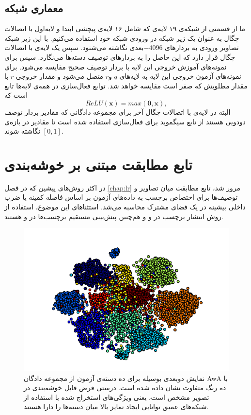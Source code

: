 \subsection{معماری شبکه}\label{net_architechture}
ما از قسمتی از شبکه‌ی ۱۹ لایه‌ی  \cite{vgg} که شامل ۱۶ لایه‌ی پیچشی ابتدا و لایه‌‌‌اول با اتصالات چگال به عنوان یک زیر شبکه در ورودی شبکه خود استفاده می‌کنیم. با این زیر شبکه تصاویر ورودی به بردارهای $-4096$بعدی نگاشته می‌شنود. سپس یک لایه‌ی با اتصالات چگال قرار دارد که این حاصل را به بردارهای توصیف دسته‌ها می‌نگارد. سپس برای نمونه‌های آموزش خروجی این لایه با بردار توصیف صحیح مقایسه می‌شود. برای نمونه‌های آزمون خروجی این لایه به  لایه‌های  $q$ و$r$ متصل می‌شود و مقدار خروجی $r$ با مقدار مطلوبش که صفر است مقایسه خواهد شد.
توابع فعال‌سازی در همه‌ی لایه‌ها تابع  است که
\begin{equation}
ReLU(\mathbf{x}) = max(\mathbf{0,x}),
\end{equation}
البته در لایه‌ی با اتصالات چگال آخر برای مجموعه‌ دادگانی که مقادیر بردار توصف دودویی هستند از تابع سیگموید برای فعال‌سازی استفاده شده است تا مقادیر در بازه‌ی $[0,1]$ نگاشته شوند.
\section{ تابع مطابقت مبتنی بر خوشه‌بندی }\label{compatibility_funcion}
در اکثر روش‌های پیشین که در فصل \ref{chap:lr} مرور شد، تابع مطابقت میان تصاویر و توصیف‌ها برای اختصاص برچسب به داده‌های آزمون بر اساس فاصله کمینه یا ضرب داخلی بیشینه در یک فضای مشترک محاسبه می‌شد. استثناهای این موضوع، استفاده از روش انتشار برچسب در \cite{Fu2014} و \cite{Kodirov2015} و هم‌چنین پیش‌بینی مستقیم برچسب‌ها در
\cite{li15max}
و
\cite{semi15}
هستند.

\begin{figure}[!t]
\centering
\includegraphics[width=0.85\linewidth]{images/awa_clusters}
\caption[نمایش دسته‌های آزمون مجموعه دادگان AwA ]{
نمایش دوبعدی بوسیله  برای ده دسته‌ی آزمون از مجموعه دادگان AwA با ده رنگ متفاوت نشان داده شده است. درستی فرض قابل خوشه‌بندی در تصویر مشخص است، یعنی ویژگی‌های استخراج شده با استفاده از شبکه‌های عمیق توانایی ایجاد تمایز بالا میان دسته‌ها را دارا هستند.
}
\label{fig:awa_clusters}
\end{figure}

